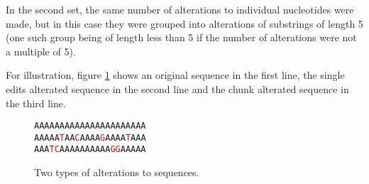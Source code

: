 In the second set, the same number of alterations to individual nucleotides
were made, but in this case they were grouped into alterations of substrings of
length 5 (one such group being of length less than 5 if the number of
alterations were not a multiple of 5).

For illustration, figure \ref{fig:alterations} shows an original sequence in
the first line, the single edits alterated sequence in the second line and the
chunk alterated sequence in the third line.

\newcommand{\tc}[1]{\textcolor{red}{#1}}
\begin{figure}[H]
  \centering
  \texttt{AAAAAAAAAAAAAAAAAAAAAA} \\
  \texttt{AAAAA\tc{T}AA\tc{C}AAAA\tc{G}AAAA\tc{T}AAA} \\
  \texttt{AAA\tc{TC}AAAAAAAAAA\tc{GG}AAAAA}
  \caption{Two types of alterations to sequences.}
  \label{fig:alterations}
\end{figure}
